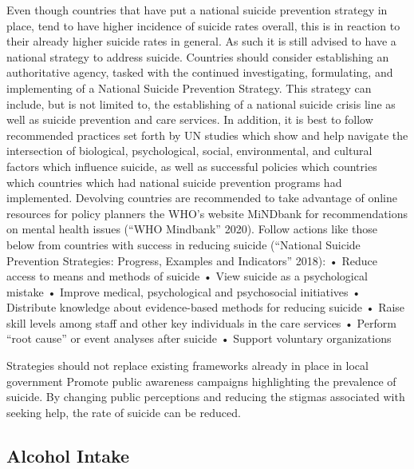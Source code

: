 \documentclass[]{article}
\begin{document}
Even though countries that have put a national suicide prevention
strategy in place, tend to have higher incidence of suicide rates
overall, this is in reaction to their already higher suicide rates in
general. As such it is still advised to have a national strategy to
address suicide. Countries should consider establishing an authoritative
agency, tasked with the continued investigating, formulating, and
implementing of a National Suicide Prevention Strategy. This strategy
can include, but is not limited to, the establishing of a national
suicide crisis line as well as suicide prevention and care services. In
addition, it is best to follow recommended practices set forth by UN
studies which show and help navigate the intersection of biological,
psychological, social, environmental, and cultural factors which
influence suicide, as well as successful policies which countries which
countries which had national suicide prevention programs had
implemented. Devolving countries are recommended to take advantage of
online resources for policy planners the WHO's website MiNDbank for
recommendations on mental health issues (``WHO Mindbank'' 2020). Follow
actions like those below from countries with success in reducing suicide
(``National Suicide Prevention Strategies: Progress, Examples and
Indicators'' 2018): • Reduce access to means and methods of suicide •
View suicide as a psychological mistake • Improve medical, psychological
and psychosocial initiatives • Distribute knowledge about evidence-based
methods for reducing suicide • Raise skill levels among staff and other
key individuals in the care services • Perform ``root cause'' or event
analyses after suicide • Support voluntary organizations

Strategies should not replace existing frameworks already in place in
local government Promote public awareness campaigns highlighting the
prevalence of suicide. By changing public perceptions and reducing the
stigmas associated with seeking help, the rate of suicide can be
reduced.

\subsection{Alcohol Intake}\label{alcohol-intake}
\end{document}
